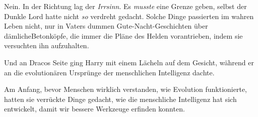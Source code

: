Nein. In der Richtung lag der \emph{Irrsinn}. Es \emph{musste} eine Grenze geben, selbst der Dunkle Lord hatte nicht \emph{so} verdreht gedacht. Solche Dinge passierten im wahren Leben nicht, nur in Vaters dummen Gute-Nacht-Geschichten über dämlicheBetonköpfe, die immer die Pläne des Helden vorantrieben, indem sie versuchten ihn aufzuhalten.

\later

Und an Dracos Seite ging Harry mit einem Lächeln auf dem Gesicht, während er an die evolutionären Ursprünge der menschlichen Intelligenz dachte.

Am Anfang, bevor Menschen wirklich verstanden, wie Evolution funktionierte, hatten sie verrückte Dinge gedacht, wie die menschliche Intelligenz hat sich entwickelt, damit wir bessere Werkzeuge erfinden konnten.

